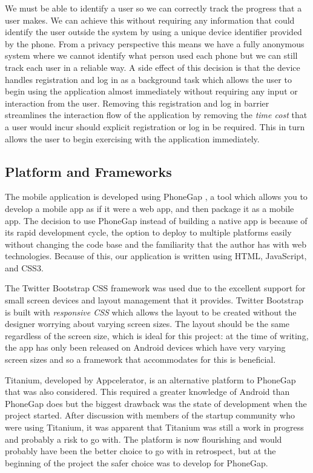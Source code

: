 We must be able to identify a user so we can correctly track the
progress that a user makes. We can achieve this without requiring any
information that could identify the user outside the system by using a
unique device identifier provided by the phone. From a privacy 
perspective this means we have a fully anonymous system where we
cannot identify what person used each phone but we can still track
each user in a reliable way. A side effect of this decision is that
the device handles registration and log in as a background task which
allows the user to begin using the application almost immediately
without requiring any input or interaction from the user. Removing
this registration and log in barrier streamlines the interaction flow
of the application by removing the \emph{time cost} that a user would
incur should explicit registration or log in be required. This in turn
allows the user to begin exercising with the application immediately.

\subsection{Platform and Frameworks}
The mobile application is developed using PhoneGap \cite{phonegap}, 
a tool which allows you to develop a mobile app as if it were
a web app, and then package it as a mobile app. The decision to use
PhoneGap instead of building a native app is because of its rapid
development cycle, the option to deploy to multiple platforms easily
without changing the code base and the familiarity that the author has
with web technologies. Because of this, our application is written
using HTML, JavaScript, and CSS3. 

The Twitter Bootstrap CSS framework\cite{bootstrap} was used due to
the excellent support for small screen devices and layout management
that it provides. Twitter Bootstrap is built with \emph{responsive
  CSS} which allows the layout to be created without the designer
worrying about varying screen sizes. The layout should be the same
regardless of the screen size, which is ideal for this project: at the
time of writing, the app has only been released on Android devices 
which have very varying screen sizes and so a framework that
accommodates for this is beneficial.

Titanium, developed by Appcelerator\cite{titanium}, is an alternative
platform to PhoneGap that was also considered. This required a greater
knowledge of Android than PhoneGap does but the biggest drawback was
the state of development when the project started. After discussion
with members of the startup community who were using Titanium, it was
apparent that Titanium was still a work in progress and probably a
risk to go with. The platform is now flourishing and would probably
have been the better choice to go with in retrospect, but at the
beginning of the project the safer choice was to develop for PhoneGap.

